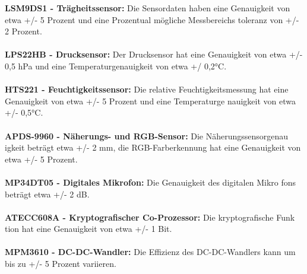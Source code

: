 \textbf{LSM9DS1 - Trägheitssensor:} Die Sensordaten haben eine Genauigkeit
von etwa +/- 5 Prozent und eine Prozentual mögliche Messbereichs
toleranz von +/- 2 Prozent.
\\\\
\textbf{LPS22HB - Drucksensor:} Der Drucksensor hat eine Genauigkeit von
etwa +/- 0,5 hPa und eine Temperaturgenauigkeit von etwa +/
0,2°C.
\\\\
\textbf{HTS221 - Feuchtigkeitssensor:} Die relative Feuchtigkeitsmessung hat
eine Genauigkeit von etwa +/- 5 Prozent und eine Temperaturge
nauigkeit von etwa +/- 0,5°C.
\\\\
\textbf{APDS-9960 - Näherungs- und RGB-Sensor:} Die Näherungssensorgenau
igkeit beträgt etwa +/- 2 mm, die RGB-Farberkennung hat eine
Genauigkeit von etwa +/- 5 Prozent.
\\\\
\textbf{MP34DT05 - Digitales Mikrofon:} Die Genauigkeit des digitalen Mikro
fons beträgt etwa +/- 2 dB.
\\\\
\textbf{ATECC608A - Kryptografischer Co-Prozessor:} Die kryptografische Funk
tion hat eine Genauigkeit von etwa +/- 1 Bit.
\\\\
\textbf{MPM3610 - DC-DC-Wandler:} Die Effizienz des DC-DC-Wandlers kann
um bis zu +/- 5 Prozent variieren.
\\
